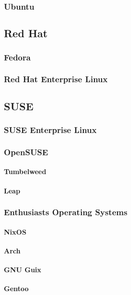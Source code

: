 \subsubsection{Ubuntu}
\subsection{Red Hat}
\subsubsection{Fedora}
\subsubsection{Red Hat Enterprise Linux}
\subsection{SUSE}
\subsubsection{SUSE Enterprise Linux}
\subsubsection{OpenSUSE}
\paragraph{Tumbelweed}
\paragraph{Leap}
\subsubsection{Enthusiasts Operating Systems}
\paragraph{NixOS}
\paragraph{Arch}
\paragraph{GNU Guix}
\paragraph{Gentoo}


